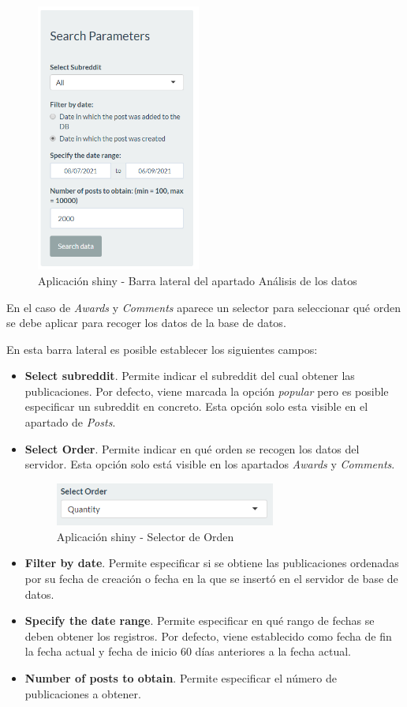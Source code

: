 \documentclass[../../main.tex]{subfiles}
\begin{document}
\begin{figure}[H]
\centering
\includegraphics[height=250pt]{images/apendices/db-sidebar.png}
\caption{Aplicación \Gls{shiny} - Barra lateral del apartado Análisis de los datos}
\end{figure}

En el caso de \textit{Awards} y \textit{Comments} aparece un selector para seleccionar qué orden se debe aplicar para recoger los datos de la base de datos.


En esta barra lateral es posible establecer los siguientes campos:
\begin{itemize}
    \item \textbf{Select \Gls{subreddit}}. Permite indicar el \gls{subreddit} del cual obtener las publicaciones. Por defecto, viene marcada la opción \textit{popular} pero es posible especificar un subreddit en concreto. Esta opción solo esta visible en el apartado de \textit{Posts}.
    \item \textbf{Select Order}. Permite indicar en qué orden se recogen los datos del servidor. Esta opción solo está visible en los apartados \textit{Awards} y \textit{Comments}.
    \begin{figure}[H]
    \centering
    \includegraphics[height=40pt]{images/apendices/db-sidebar2.png}
    \caption{Aplicación \Gls{shiny} - Selector de Orden}
    \end{figure}
    \item \textbf{Filter by date}. Permite especificar si se obtiene las publicaciones ordenadas por su fecha de creación o fecha en la que se insertó en el servidor de base de datos.
    \item \textbf{Specify the date range}. Permite especificar en qué rango de fechas se deben obtener los registros. Por defecto, viene establecido como fecha de fin la fecha actual y fecha de inicio 60 días anteriores a la fecha actual.
    \item \textbf{Number of posts to obtain}. Permite especificar el número de publicaciones a obtener. 
\end{itemize}
\end{document}
